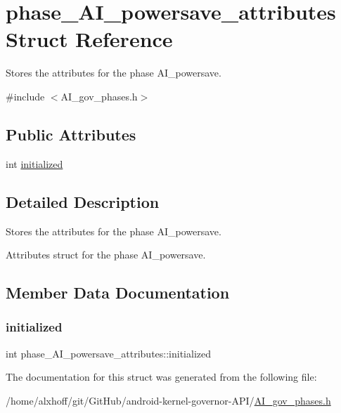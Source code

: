 \hypertarget{structphase__AI__powersave__attributes}{}\section{phase\+\_\+\+A\+I\+\_\+powersave\+\_\+attributes Struct Reference}
\label{structphase__AI__powersave__attributes}


Stores the attributes for the phase A\+I\+\_\+powersave.  




{\ttfamily \#include $<$A\+I\+\_\+gov\+\_\+phases.\+h$>$}

\subsection*{Public Attributes}
\begin{DoxyCompactItemize}
\item 
int \hyperlink{structphase__AI__powersave__attributes_a88b5fd6834c3fef2e5cef8c616d999ab}{initialized}
\end{DoxyCompactItemize}


\subsection{Detailed Description}
Stores the attributes for the phase A\+I\+\_\+powersave. 

Attributes struct for the phase A\+I\+\_\+powersave. 

\subsection{Member Data Documentation}
\mbox{\label{structphase__AI__powersave__attributes_a88b5fd6834c3fef2e5cef8c616d999ab}} 
\subsubsection{\texorpdfstring{initialized}{initialized}}
{\footnotesize\ttfamily int phase\+\_\+\+A\+I\+\_\+powersave\+\_\+attributes\+::initialized}



The documentation for this struct was generated from the following file\+:\begin{DoxyCompactItemize}
\item 
/home/alxhoff/git/\+Git\+Hub/android-\/kernel-\/governor-\/\+A\+P\+I/\hyperlink{AI__gov__phases_8h}{A\+I\+\_\+gov\+\_\+phases.\+h}\end{DoxyCompactItemize}
